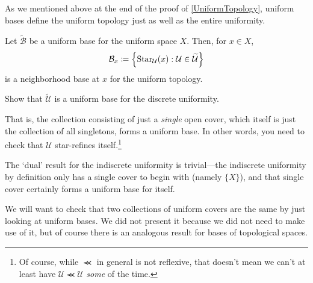 As we mentioned above at the end of the proof of \cref{UniformTopology}, uniform bases define the uniform topology just as well as the entire uniformity.
\begin{crl}
Let $\widetilde{\mathcal{B}}$ be a uniform base for the uniform space $X$.  Then, for $x\in X$,
\begin{equation}
\mathcal{B}_x\coloneqq \left\{ \operatorname{Star} _{\mathcal{U}}(x):\mathcal{U}\in \widetilde{\mathcal{U}}\right\}
\end{equation}
is a neighborhood base at $x$ for the uniform topology.
\end{crl}
\begin{exr}
Show that $\widetilde{\mathcal{U}}$ is a uniform base for the discrete uniformity.
\begin{rmk}
That is, the collection consisting of just a \emph{single} open cover, which itself is just the collection of all singletons, forms a uniform base.  In other words, you need to check that $\mathcal{U}$ star-refines itself.\footnote{Of course, while $\llcurly$ in general is not reflexive, that doesn't mean we can't at least have $\mathcal{U}\llcurly \mathcal{U}$ \emph{some} of the time.}
\end{rmk}
\begin{rmk}
The `dual' result for the indiscrete uniformity is trivial---the indiscrete uniformity by definition only has a single cover to begin with (namely $\{ X\}$), and that single cover certainly forms a uniform base for itself.
\end{rmk}
\end{exr}
We will want to check that two collections of uniform covers are the same by just looking at uniform bases.  We did not present it because we did not need to make use of it, but of course there is an analogous result for bases of topological spaces.
